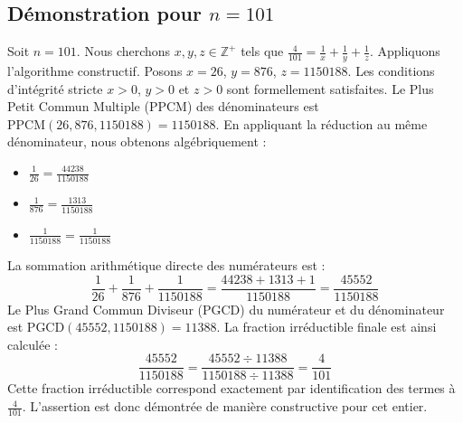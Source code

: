 \documentclass[11pt,a4paper]{article}
\begin{document}
\subsection{Démonstration pour $n = 101$}
Soit $n = 101$. Nous cherchons $x, y, z \in \mathbb{Z}^{+}$ tels que $\frac{4}{101} = \frac{1}{x} + \frac{1}{y} + \frac{1}{z}$.
Appliquons l'algorithme constructif. Posons $x = 26$, $y = 876$, $z = 1150188$.
Les conditions d'intégrité stricte $x > 0$, $y > 0$ et $z > 0$ sont formellement satisfaites.
Le Plus Petit Commun Multiple (PPCM) des dénominateurs est $\text{PPCM}(26, 876, 1150188) = 1150188$.
En appliquant la réduction au même dénominateur, nous obtenons algébriquement :
\begin{itemize}
    \item $\frac{1}{26} = \frac{44238}{1150188}$
    \item $\frac{1}{876} = \frac{1313}{1150188}$
    \item $\frac{1}{1150188} = \frac{1}{1150188}$
\end{itemize}
La sommation arithmétique directe des numérateurs est :
$$ \frac{1}{26} + \frac{1}{876} + \frac{1}{1150188} = \frac{44238 + 1313 + 1}{1150188} = \frac{45552}{1150188} $$
Le Plus Grand Commun Diviseur (PGCD) du numérateur et du dénominateur est $\text{PGCD}(45552, 1150188) = 11388$.
La fraction irréductible finale est ainsi calculée :
$$ \frac{45552}{1150188} = \frac{45552 \div 11388}{1150188 \div 11388} = \frac{4}{101} $$
Cette fraction irréductible correspond exactement par identification des termes à $\frac{4}{101}$. L'assertion est donc démontrée de manière constructive pour cet entier.
\end{document}
